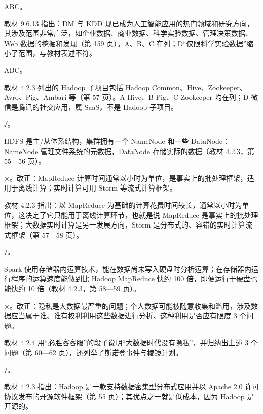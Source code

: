 \documentclass[a4paper,11pt]{article}
\begin{document}
\q ABC。\begin{analysis}教材 9.6.13 指出：DM 与 KDD 现已成为人工智能应用的热门领域和研究方向，其涉及范围非常广泛，如企业数据、商业数据、科学实验数据、管理决策数据、Web 数据的挖掘和发现（第 159 页）。A、B、C 在列；D“仅限科学实验数据”缩小了范围，与教材表述不符。\end{analysis}

\q ABC。\begin{analysis}教材 4.2.3 列出的 Hadoop 子项目包括 Hadoop Common、Hive、Zookeeper、Avro、Pig、Ambari 等（第 57 页）。A Hive、B Pig、C Zookeeper 均在列；D 微信是腾讯的社交应用，属 SaaS，不是 Hadoop 子项目。\end{analysis}


\q √。\begin{analysis}HDFS 是主/从体系结构，集群拥有一个 NameNode 和一些 DataNode：NameNode 管理文件系统的元数据，DataNode 存储实际的数据（教材 4.2.3，第 55—56 页）。\end{analysis}

\q ×。改正：MapReduce 计算时间通常以小时为单位，是事实上的批处理框架，适用于离线计算；实时计算可用 Storm 等流式计算框架。\begin{analysis}教材 4.2.3 指出：以 MapReduce 为基础的计算花费时间较长，通常以小时为单位，这决定了它只能用于离线计算环节，也就是说 MapReduce 是事实上的批处理框架；大数据实时计算是另一发展方向，Storm 是分布式的、容错的实时计算流式框架（第 57—58 页）。\end{analysis}

\q √。\begin{analysis}Spark 使用存储器内运算技术，能在数据尚未写入硬盘时分析运算；在存储器内运行程序的运算速度能做到比 Hadoop MapReduce 快约 100 倍，即便运行于硬盘也能快约 10 倍（教材 4.2.3，第 58—59 页）。\end{analysis}

\q ×。改正：隐私是大数据最严重的问题；个人数据可能被随意收集和滥用，涉及数据应当属于谁、谁有权利利用这些数据进行分析、这种利用是否应有限度 3 个问题。\begin{analysis}教材 4.2.4 用“必胜客客服”的段子说明“大数据时代没有隐私”，并归纳出上述 3 个问题（第 60—62 页），还列举了斯诺登事件与棱镜计划。\end{analysis}

\q √。\begin{analysis}教材 4.2.3 指出：Hadoop 是一款支持数据密集型分布式应用并以 Apache 2.0 许可协议发布的开源软件框架（第 55 页）；其优点之一就是低成本，因为 Hadoop 是开源的。\end{analysis}
\end{document}
